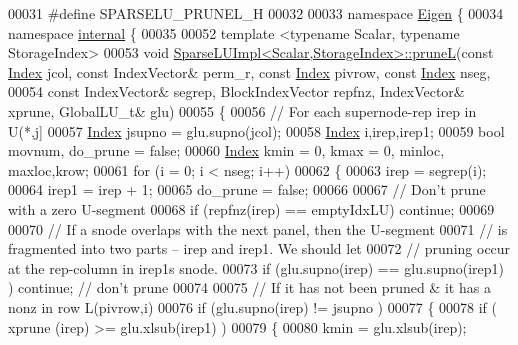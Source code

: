\begin{DoxyCode}
00031 \textcolor{preprocessor}{#define SPARSELU\_PRUNEL\_H}
00032 
00033 \textcolor{keyword}{namespace }\hyperlink{namespace_eigen}{Eigen} \{
00034 \textcolor{keyword}{namespace }\hyperlink{namespaceinternal}{internal} \{
00035 
00052 \textcolor{keyword}{template} <\textcolor{keyword}{typename} Scalar, \textcolor{keyword}{typename} StorageIndex>
00053 \textcolor{keywordtype}{void} \hyperlink{group___sparse_l_u___module_a350464d1c83182fbd7da8a5a74bdfde8}{SparseLUImpl<Scalar,StorageIndex>::pruneL}(\textcolor{keyword}{const} 
      \hyperlink{namespace_eigen_a62e77e0933482dafde8fe197d9a2cfde}{Index} jcol, \textcolor{keyword}{const} IndexVector& perm\_r, \textcolor{keyword}{const} \hyperlink{namespace_eigen_a62e77e0933482dafde8fe197d9a2cfde}{Index} pivrow, \textcolor{keyword}{const} \hyperlink{namespace_eigen_a62e77e0933482dafde8fe197d9a2cfde}{Index} nseg,
00054                                                \textcolor{keyword}{const} IndexVector& segrep, BlockIndexVector repfnz, 
      IndexVector& xprune, GlobalLU\_t& glu)
00055 \{
00056   \textcolor{comment}{// For each supernode-rep irep in U(*,j]}
00057   \hyperlink{namespace_eigen_a62e77e0933482dafde8fe197d9a2cfde}{Index} jsupno = glu.supno(jcol); 
00058   \hyperlink{namespace_eigen_a62e77e0933482dafde8fe197d9a2cfde}{Index} i,irep,irep1; 
00059   \textcolor{keywordtype}{bool} movnum, do\_prune = \textcolor{keyword}{false}; 
00060   \hyperlink{namespace_eigen_a62e77e0933482dafde8fe197d9a2cfde}{Index} kmin = 0, kmax = 0, minloc, maxloc,krow; 
00061   \textcolor{keywordflow}{for} (i = 0; i < nseg; i++)
00062   \{
00063     irep = segrep(i); 
00064     irep1 = irep + 1; 
00065     do\_prune = \textcolor{keyword}{false}; 
00066     
00067     \textcolor{comment}{// Don't prune with a zero U-segment }
00068     \textcolor{keywordflow}{if} (repfnz(irep) == emptyIdxLU) \textcolor{keywordflow}{continue}; 
00069     
00070     \textcolor{comment}{// If a snode overlaps with the next panel, then the U-segment}
00071     \textcolor{comment}{// is fragmented into two parts -- irep and irep1. We should let }
00072     \textcolor{comment}{// pruning occur at the rep-column in irep1s snode. }
00073     \textcolor{keywordflow}{if} (glu.supno(irep) == glu.supno(irep1) ) \textcolor{keywordflow}{continue}; \textcolor{comment}{// don't prune }
00074     
00075     \textcolor{comment}{// If it has not been pruned & it has a nonz in row L(pivrow,i)}
00076     \textcolor{keywordflow}{if} (glu.supno(irep) != jsupno )
00077     \{
00078       \textcolor{keywordflow}{if} ( xprune (irep) >= glu.xlsub(irep1) )
00079       \{
00080         kmin = glu.xlsub(irep);

\end{DoxyCode}
